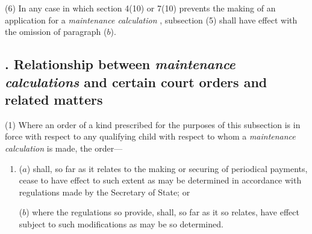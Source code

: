 \documentclass[12pt,a4paper]{article}
\begin{document}
(6) In any case in which section 4(10) or 7(10) prevents the making of an application for a 
\emph{maintenance calculation}%
, 
%
%
%
subsection (5) shall have effect with the omission of paragraph ($b$).


\subsection[10. Relationship between 
\emph{maintenance calculations}  %
and certain court orders and related matters]{. Relationship between 
\emph{maintenance calculations}  %
and certain court orders and related matters}

(1) Where an order of a kind prescribed for the purposes of this subsection is in force with respect to any qualifying child with respect to whom a 
\emph{maintenance calculation}  %
is made, the order—
\begin{enumerate}\item[]
($a$) shall, so far as it relates to the making or securing of periodical payments, cease to have effect to such extent as may be determined in accordance with regulations made by the Secretary of State; or

($b$) where the regulations so provide, shall, so far as it so relates, have effect subject to such modifications as may be so determined.
\end{enumerate}
\end{document}
